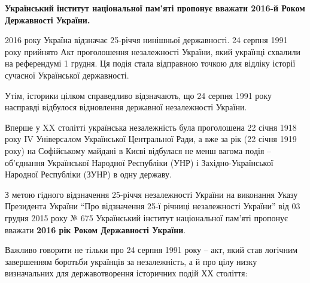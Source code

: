  
 
 
 
 

\begin{center}
\textbf{Український інститут національної пам'яті пропонує вважати 2016-й Роком Державності України.}
\end{center}


2016 року Україна відзначає 25-річчя нинішньої державності. 24 серпня 1991 року
прийнято Акт проголошення незалежності України, який українці схвалили на
референдумі 1 грудня. Ця подія стала відправною точкою для відліку історії
сучасної Української державності.

Утім, історики цілком справедливо відзначають, що 24 серпня 1991 року насправді
відбулося відновлення державної незалежності України.

Вперше у XX столітті українська незалежність була проголошена 22 січня 1918
року IV Універсалом Української Центральної Ради, а вже за рік (22 січня 1919
року) на Софійському майдані в Києві відбулася не менш вагома подія –
об'єднання Української Народної Республіки (УНР) і Західно-Української Народної
Республіки (ЗУНР) в одну державу.

З метою гідного відзначення 25-річчя незалежності України на виконання Указу
Президента України \enquote{Про відзначення 25-ї річниці незалежності України} від 03
грудня 2015 року № 675 Український інститут національної пам'яті пропонує
вважати \textbf{2016 рік Роком Державності України}.

Важливо говорити не тільки про 24 серпня 1991 року – акт, який став логічним
завершенням боротьби українців за незалежність, а й про цілу низку визначальних
для державотворення історичних подій ХХ століття:

